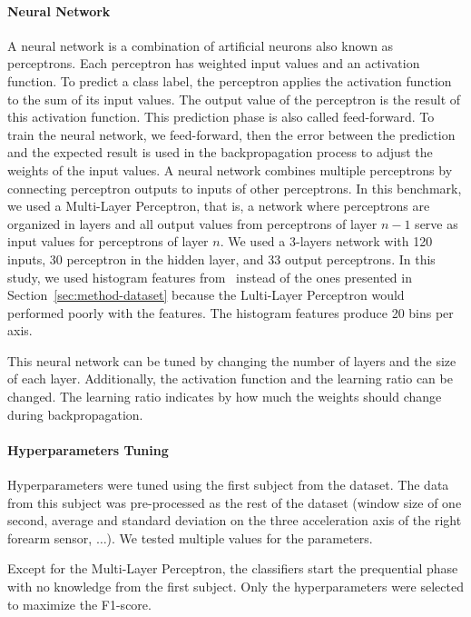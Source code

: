 \paragraph{Neural Network}
A neural network is a combination of artificial
neurons also known as perceptrons. Each
perceptron has weighted input values and an
activation function. To predict a class label, the
perceptron applies the activation function to the sum
of its input values. The output
value of the perceptron is the result of this
activation function. This prediction phase is also
called feed-forward. To train the neural network,
we feed-forward, then the error between the
prediction and the expected result is used in the
backpropagation process to adjust the weights of
the input values.  A neural network combines
multiple perceptrons by connecting perceptron outputs
to inputs of other perceptrons.  In
this benchmark, we used a Multi-Layer Perceptron, 
that is, a network where perceptrons are organized in
layers and all output
values from perceptrons of layer $n-1$ serve as
input values for perceptrons of layer $n$. 
We used a 3-layers network with 120 inputs, 30
perceptron in the hidden layer, and 33 output
perceptrons.
In this study, we used histogram features
from~\cite{omid_2019} instead of the ones
presented in Section~\ref{sec:method-dataset}
because the Lulti-Layer Perceptron would performed
poorly with the features. The histogram features
produce 20 bins per axis.

This neural network can be tuned by changing the
number of layers and the size of each layer.
Additionally, the activation function and the
learning ratio can be changed. The learning ratio
indicates by how much the weights should change
during backpropagation.


\paragraph{Hyperparameters Tuning}
Hyperparameters were tuned using the first
subject from the \banosdataset dataset.  The data from
this subject was pre-processed as the rest of
the \banosdataset dataset (window size of one second,
average and standard deviation on the three
acceleration axis of the right forearm sensor,
$\ldots$). We tested multiple values for the
parameters.

Except for the Multi-Layer Perceptron, the
classifiers start the prequential phase with no
knowledge from the first subject. Only the
hyperparameters were selected to maximize the
F1-score.

